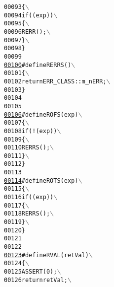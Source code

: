\begin{footnotesize}
\begin{alltt}
00093 \textcolor{preprocessor}{\{                             \(\backslash\)}
00094 \textcolor{preprocessor}{        if( ( exp ) )               \(\backslash\)}
00095 \textcolor{preprocessor}{\{                           \(\backslash\)}
00096 \textcolor{preprocessor}{        RERR();                    \(\backslash\)}
00097 \textcolor{preprocessor}{        \}                           \(\backslash\)}
00098 \textcolor{preprocessor}{        \}}
00099 \textcolor{preprocessor}{}
\hypertarget{_macros_8h_source_l00100}{}\hyperlink{_macros_8h_a3114aa2f07f5e406deab0d0e067f1a69}{00100} \textcolor{preprocessor}{#define RERRS( )               \(\backslash\)}
00101 \textcolor{preprocessor}{\{                             \(\backslash\)}
00102 \textcolor{preprocessor}{        return ERR\_CLASS::m\_nERR;     \(\backslash\)}
00103 \textcolor{preprocessor}{        \}}
00104 \textcolor{preprocessor}{}
00105 
\hypertarget{_macros_8h_source_l00106}{}\hyperlink{_macros_8h_a7f0ed3ef64d6418e1ea394cb4639e7fb}{00106} \textcolor{preprocessor}{#define ROFS( exp )           \(\backslash\)}
00107 \textcolor{preprocessor}{\{                             \(\backslash\)}
00108 \textcolor{preprocessor}{        if( !( exp ) )              \(\backslash\)}
00109 \textcolor{preprocessor}{\{                           \(\backslash\)}
00110 \textcolor{preprocessor}{        RERRS();                  \(\backslash\)}
00111 \textcolor{preprocessor}{        \}                           \(\backslash\)}
00112 \textcolor{preprocessor}{        \}}
00113 \textcolor{preprocessor}{}
\hypertarget{_macros_8h_source_l00114}{}\hyperlink{_macros_8h_a69320a3fbd53f5404551e7ed06ccfe1c}{00114} \textcolor{preprocessor}{#define ROTS( exp )           \(\backslash\)}
00115 \textcolor{preprocessor}{\{                             \(\backslash\)}
00116 \textcolor{preprocessor}{        if( ( exp ) )               \(\backslash\)}
00117 \textcolor{preprocessor}{\{                           \(\backslash\)}
00118 \textcolor{preprocessor}{        RERRS();                  \(\backslash\)}
00119 \textcolor{preprocessor}{        \}                           \(\backslash\)}
00120 \textcolor{preprocessor}{        \}}
00121 \textcolor{preprocessor}{}
00122 
\hypertarget{_macros_8h_source_l00123}{}\hyperlink{_macros_8h_aa27268ba4471c4968c6ff5898ea692eb}{00123} \textcolor{preprocessor}{#define RVAL( retVal )        \(\backslash\)}
00124 \textcolor{preprocessor}{\{                             \(\backslash\)}
00125 \textcolor{preprocessor}{        ASSERT( 0 );              \(\backslash\)}
00126 \textcolor{preprocessor}{        return retVal;            \(\backslash\)}

\end{alltt}
\end{footnotesize}
